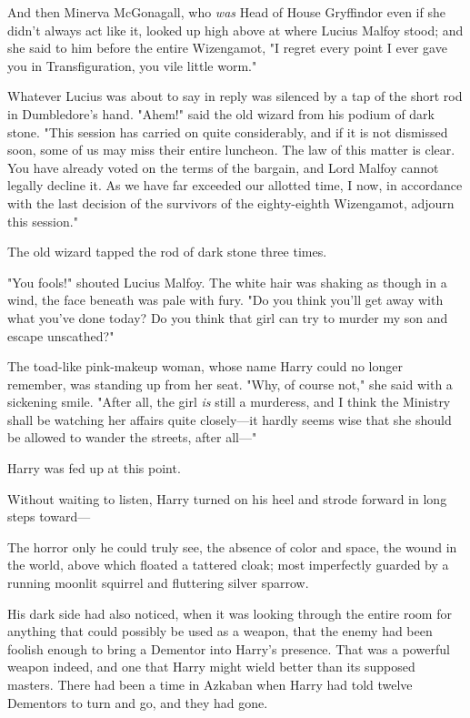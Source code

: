 And then Minerva McGonagall, who \emph{was} Head of House Gryffindor even if 
she didn't always act like it, looked up high above at where Lucius Malfoy 
stood; and she said to him before the entire Wizengamot, "I regret every point 
I ever gave you in Transfiguration, you vile little worm."

Whatever Lucius was about to say in reply was silenced by a tap of the short 
rod in Dumbledore's hand. "Ahem!" said the old wizard from his podium of dark 
stone. "This session has carried on quite considerably, and if it is not 
dismissed soon, some of us may miss their entire luncheon. The law of this 
matter is clear. You have already voted on the terms of the bargain, and Lord 
Malfoy cannot legally decline it. As we have far exceeded our allotted time, I 
now, in accordance with the last decision of the survivors of the eighty-eighth 
Wizengamot, adjourn this session."

The old wizard tapped the rod of dark stone three times.

"You fools!" shouted Lucius Malfoy. The white hair was shaking as though in a 
wind, the face beneath was pale with fury. "Do you think you'll get away with 
what you've done today? Do you think that girl can try to murder my son and 
escape unscathed?"

The toad-like pink-makeup woman, whose name Harry could no longer remember, was 
standing up from her seat. "Why, of course not," she said with a sickening 
smile. "After all, the girl \emph{is} still a murderess, and I think the 
Ministry shall be watching her affairs quite closely---it hardly seems wise 
that she should be allowed to wander the streets, after all---"

Harry was fed up at this point.

Without waiting to listen, Harry turned on his heel and strode forward in long 
steps toward---

The horror only he could truly see, the absence of color and space, the wound 
in the world, above which floated a tattered cloak; most imperfectly guarded by 
a running moonlit squirrel and fluttering silver sparrow.

His dark side had also noticed, when it was looking through the entire room for 
anything that could possibly be used as a weapon, that the enemy had been 
foolish enough to bring a Dementor into Harry's presence. That was a powerful 
weapon indeed, and one that Harry might wield better than its supposed masters. 
There had been a time in Azkaban when Harry had told twelve Dementors to turn 
and go, and they had gone.

